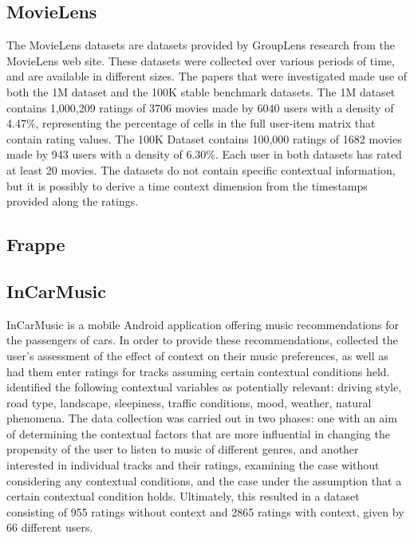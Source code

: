 

\subsection{MovieLens}
The MovieLens datasets are datasets provided by GroupLens research from the MovieLens web site.
These datasets were collected over various periods of time, and are available in different sizes\cite{movielens}.
The papers that were investigated made use of both the 1M dataset and the 100K stable benchmark datasets.
The 1M dataset contains 1,000,209 ratings of 3706 movies made by 6040 users with a density of 4.47\%, representing the percentage of cells in the full user-item matrix that contain rating values\cite{MovieLens2015}.
The 100K Dataset contains 100,000 ratings of 1682 movies made by 943 users with a density of 6.30\%\cite{MovieLens2015}.
Each user in both datasets has rated at least 20 movies.
The datasets do not contain specific contextual information, but it is possibly to derive a time context dimension from the timestamps provided along the ratings.

\subsection{Frappe}

\subsection{InCarMusic}
InCarMusic is a mobile Android application offering music recommendations for the passengers of cars.
In order to provide these recommendations, \cite{InCarMusic2011} collected the user's assessment of the effect of context on their music preferences, as well as had them enter ratings for tracks assuming certain contextual conditions held.
\cite{InCarMusic2011} identified the following contextual variables as potentially relevant: driving style, road type, landscape, sleepiness, traffic conditions, mood, weather, natural phenomena.
The data collection was carried out in two phases: one with an aim of determining the contextual factors that are more influential in changing the propensity of the user to listen to music of different genres, and another interested in individual tracks and their ratings, examining the case without considering any contextual conditions, and the case under the assumption that a certain contextual condition holds.
Ultimately, this resulted in a dataset consisting of 955 ratings without context and 2865 ratings with context, given by 66 different users.
